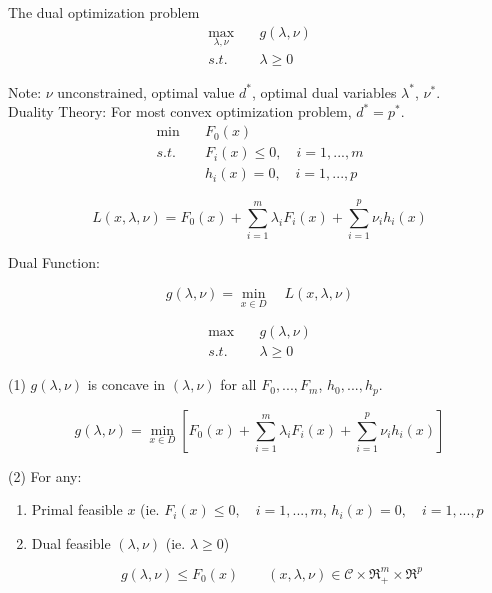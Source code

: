 \begin{definition}{The dual optimization problem}
	\begin{align*}
	\max_{\lambda, \nu} \quad&g(\lambda, \nu) \\
	s.t. \quad&\lambda \geq 0
	\end{align*}
\end{definition}
Note: $\nu$ unconstrained, optimal value $d^*$, optimal dual variables $\lambda^*$, $\nu^*$.\\

Duality Theory: For most convex optimization problem, $d^* = p^*$.\\


\begin{align*}
\min \quad&F_0(x) \\
s.t. \quad&F_i(x)\leq 0, \quad i = 1,...,m \\
&h_i(x)= 0, \quad i = 1,...,p
\end{align*}

\begin{equation*}
L(x,\lambda,\nu) = F_0(x) + \sum^m_{i=1}\lambda_i F_i(x) + \sum^p_{i=1}\nu_i h_i(x)
\end{equation*}

Dual Function:

\begin{equation*}
g(\lambda, \nu) = \min_{x\in D}\quad L(x,\lambda,\nu) 
\end{equation*}


\begin{align*}
\max \quad&g(\lambda, \nu) \\
s.t. \quad&\lambda \geq 0
\end{align*}

(1) $g(\lambda, \nu)$ is concave in $(\lambda, \nu)$ for all $F_0,...,F_m$, $h_0,...,h_p$.

\begin{equation*}
g(\lambda, \nu) =\min_{x\in D}[F_0(x) + \sum^m_{i=1}\lambda_iF_i(x) + \sum^p_{i=1}\nu_ih_i(x) ]
\end{equation*}


(2) For any:

\begin{enumerate}
	\item Primal feasible $x$ (ie. $F_i(x)\leq 0, \quad i = 1,...,m$, $h_i(x)= 0, \quad i = 1,...,p$
	
	\item Dual feasible $(\lambda, \nu)$ (ie. $\lambda \geq 0$)
	
	\begin{equation*}
	g(\lambda, \nu)\leq F_0(x) \qquad (x, \lambda, \nu) \in \mathcal{C}\times \Re^m_+\times \Re^p
	\end{equation*}
\end{enumerate}

